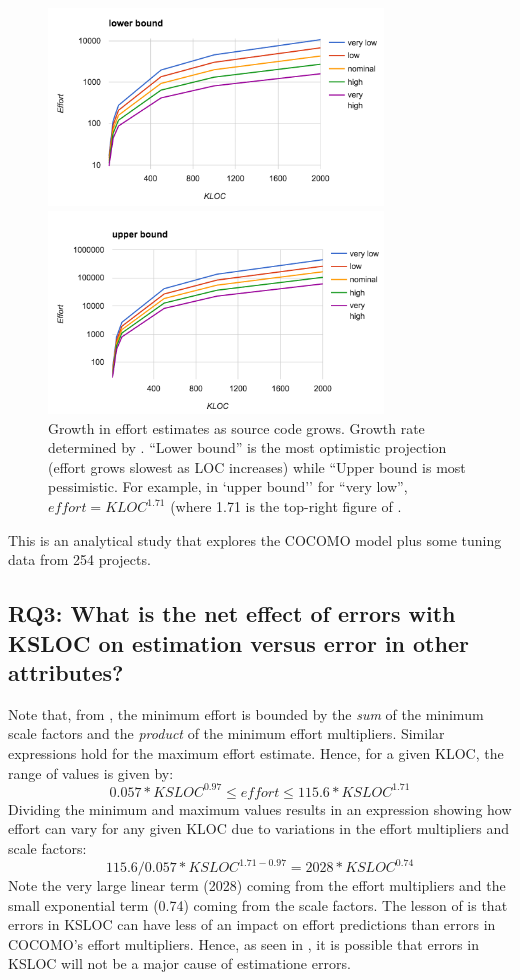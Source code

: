 \begin{figure}[!t] 
\includegraphics[width=3.5in]{Figs/lower.png}


\includegraphics[width=3.5in]{Figs/upper.png} 
\caption{Growth in effort estimates as source code grows. Growth rate determined by . 
``Lower bound'' is the most optimistic projection (effort grows slowest as LOC increases)
while ``Upper bound is most pessimistic.
For example, in `upper bound'' for ``very low'', $\mathit{effort} = \mathit{KLOC}^{1.71}$ (where 1.71 is the top-right figure of . }\label{fig:lowerupper}
\end{figure}

This is an analytical study that explores the COCOMO model plus some tuning data from 254 projects.


\subsection{RQ3: What is the net effect of errors with KSLOC on estimation
versus error in other attributes?}\label{sect:rq3}


Note that, from ,
the minimum  
effort  is bounded by the  {\em sum} of the minimum scale factors
and the {\em product} of the minimum effort multipliers.
Similar expressions hold for the  maximum effort estimate. Hence,
for a given KLOC, the range of values is given by:
\[
0.057*\mathit{KSLOC}^{0.97}  \le \mathit{effort} \le 115.6*\mathit{KSLOC}^{1.71}\]
Dividing the minimum and maximum values results in an  expression showing
how    effort can vary for any given KLOC due to variations in the effort multipliers
and scale factors: 
\begin{equation}\label{eq:ration}
115.6/0.057 *\mathit{KSLOC}^{1.71 - 0.97} = 2028*\mathit{KSLOC}^{0.74}
\end{equation}
Note the very large linear term (2028) coming from the effort multipliers and the
small exponential term (0.74) coming from the scale factors. The lesson of 
is that errors in KSLOC can have less of an impact on effort predictions than
errors in COCOMO's effort multipliers. Hence, as seen in , it is possible
that errors in KSLOC will not be a major cause of estimatione errors.